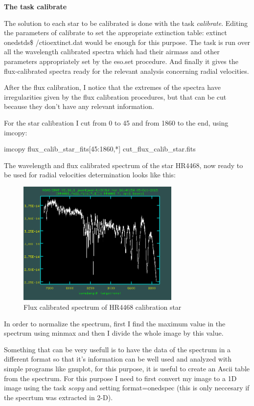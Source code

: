 \textbf{The task calibrate}

The solution to each star to be calibrated is done with the task \textit{calibrate}. Editing the parameters of calibrate to set the appropriate extinction table: extinct onedstds\$ /ctioextinct.dat would be enough for this purpose. The task is run over all the wavelength calibrated spectra which had their airmass and other parameters appropriately set by the eso.set procedure. And finally it gives the flux-calibrated spectra ready for the relevant analysis concerning radial velocities.

After the flux calibration, I notice that the extremes of the spectra have irregularities given by the flux calibration procedures, but that can be cut because they don't have any relevant information.

For the star calibration I cut from 0 to 45 and from 1860 to the end, using imcopy:

\begin{center}
imcopy flux\_calib\_star\_fits[45:1860,*] cut\_flux\_calib\_star.fits
\end{center}

The wavelength and flux calibrated spectrum of the star HR4468, now ready to be used for radial velocities determination looks like this:

\begin{figure}[H]
\centering
\includegraphics[width=8cm]{images/calib_star_flux.png}
\caption[Flux calibrated spectrum of HR4468]{Flux calibrated spectrum of HR4468 calibration star}
\end{figure}

In order to normalize the spectrum, first I find the maximum value in the spectrum using minmax and then I divide the whole image by this value. 

Something that can be very usefull is to have the data of the spectrum in a different format so that it's information can be well used and analyzed with simple programs like gnuplot, for this purpose, it is useful to create an Ascii table from the spectrum. For this purpose I need to first convert my image to a 1D image using the task \textit{scopy} and setting format=onedspec (this is only neccesary if the specrtum was extracted in 2-D).


